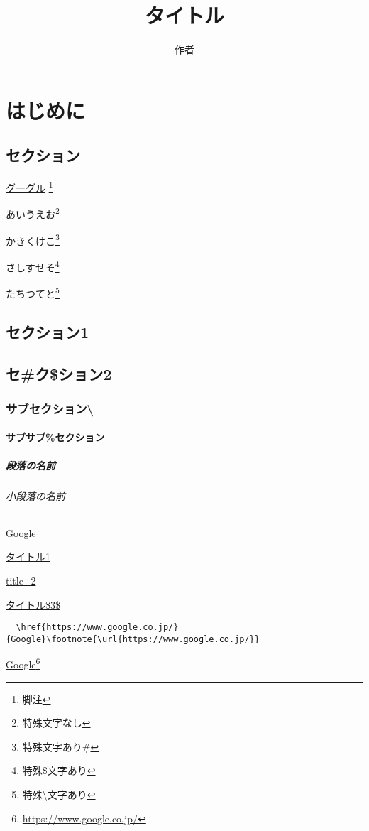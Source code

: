 \documentclass[uplatex, oneside]{jsbook}
\title{タイトル}
\author{作者}
\begin{document}
\maketitle
\tableofcontents

\chapter{はじめに}

\section{セクション}

\href{http://www.google.co.jp}{グーグル}
\footnote{脚注}

\newpage

あいうえお\footnote{特殊文字なし}

かきくけこ\footnote{特殊文字あり\#}

さしすせそ\footnote{特殊\$文字あり}

たちつてと\footnote{特殊\textbackslash 文字あり}

\newpage

\section{セクション1}

\section{セ\#ク\$ション2}

\subsection{サブセクション\textbackslash}

\subsubsection{サブサブ\%セクション}

\paragraph{段落の名前}

\subparagraph{小段落の名前}

\newpage

\href{http://www.google.co.jp}{Google}

\href{http://localhost:3000/sample/page1}{タイトル1}

\href{http://localhost:3000/sample/page2}{title\_2}

\href{http://localhost:3000/sample/page3}{タイトル\$3\$}

\newpage

\begin{verbatim}
  \href{https://www.google.co.jp/}{Google}\footnote{\url{https://www.google.co.jp/}}
\end{verbatim}

\href{https://www.google.co.jp/}{Google}\footnote{\url{https://www.google.co.jp/}}
\end{document}
